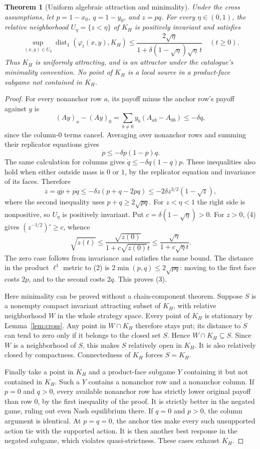 \documentclass[11pt]{article}
\newtheorem{theorem}{Theorem}
\theoremstyle{definition}
\theoremstyle{remark}
\begin{document}
\begin{theorem}[Uniform algebraic attraction and minimality]\label{thm:cross}
Under the cross assumptions, let $p=1-x_0$, $q=1-y_0$, and $z=pq$.
For every $\eta\in(0,1)$, the relative neighborhood
$U_\eta=\{z<\eta\}$ of $K_H$ is positively invariant and satisfies
\[
 \sup_{(x,y)\in U_\eta}
 \operatorname{dist}_1(\varphi_t(x,y),K_H)
 \leq
 \frac{2\sqrt\eta}
 {1+\delta(1-\sqrt\eta)\sqrt\eta\,t}
 \quad(t\geq0).                                      \tag{3}
\]
Thus $K_H$ is uniformly attracting, and is an attractor under the
catalogue's minimality convention. No point of $K_H$ is a local source in
a product-face subgame not contained in $K_H$.
\end{theorem}
\begin{proof}
For every nonanchor row $a$, its payoff minus the anchor row's payoff
against $y$ is
\[
 (Ay)_a-(Ay)_0
   =\sum_{b\neq0}y_b(A_{ab}-A_{0b})\leq-\delta q,
\]
since the column-$0$ terms cancel. Averaging over nonanchor rows and
summing their replicator equations gives
\[
 \dot p\leq-\delta p(1-p)q.
\]
The same calculation for columns gives
$\dot q\leq-\delta q(1-q)p$.
These inequalities also hold when either outside mass is $0$ or $1$,
by the replicator equation and invariance of its faces. Therefore
\[
 \dot z=q\dot p+p\dot q
 \leq-\delta z(p+q-2pq)
 \leq-2\delta z^{3/2}(1-\sqrt z),                       \tag{4}
\]
where the second inequality uses $p+q\geq2\sqrt{pq}$.
For $z<\eta<1$ the right side is nonpositive, so $U_\eta$ is positively
invariant. Put $c=\delta(1-\sqrt\eta)>0$. For $z>0$, (4) gives
$(z^{-1/2})'\geq c$, whence
\[
 \sqrt{z(t)}\leq\frac{\sqrt{z(0)}}{1+c\sqrt{z(0)}t}
 \leq\frac{\sqrt\eta}{1+c\sqrt\eta t}.
\]
The zero case follows from invariance and satisfies the same bound.
The distance in the product $\ell^1$ metric to (2) is
$2\min(p,q)\leq2\sqrt{pq}$: moving to the first face costs $2p$, and to
the second costs $2q$. This proves (3).

Here minimality can be proved without a chain-component theorem.
Suppose $S$ is a nonempty compact invariant attracting subset of $K_H$,
with relative neighborhood $W$ in the whole strategy space. Every point of
$K_H$ is stationary by Lemma~\ref{lem:cross}. Any point in $W\cap K_H$
therefore stays put; its distance to $S$ can tend to zero only if it belongs
to the closed set $S$. Hence $W\cap K_H\subseteq S$. Since $W$ is a
neighborhood of $S$, this makes $S$ relatively open in $K_H$. It is also
relatively closed by compactness. Connectedness of $K_H$ forces $S=K_H$.

Finally take a point in $K_H$ and a product-face subgame $Y$ containing it
but not contained in $K_H$. Such a $Y$ contains a nonanchor row and a
nonanchor column. If $p=0$ and $q>0$, every available nonanchor row has
strictly lower original payoff than row $0$, by the first inequality of
the proof. It is strictly better in the negated game, ruling out even Nash
equilibrium there. If $q=0$ and $p>0$, the column argument is identical.
At $p=q=0$, the anchor ties make every such unsupported action tie with
the supported action. It is then another best response in the negated
subgame, which violates quasi-strictness. These cases exhaust $K_H$.
\end{proof}
\end{document}
